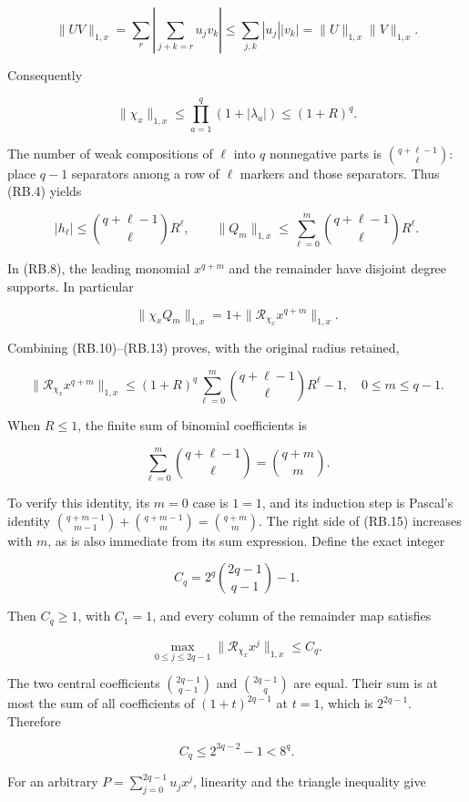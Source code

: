 \[
\|UV\|_{1,x}
=\sum_r\left|\sum_{j+k=r}u_jv_k\right|
\leq\sum_{j,k}|u_j||v_k|
=\|U\|_{1,x}\|V\|_{1,x}.
\tag{RB.10}
\]

Consequently

\[
\|\chi_x\|_{1,x}\leq\prod_{a=1}^{q}(1+|\lambda_a|)\leq(1+R)^q.
\tag{RB.11}
\]

The number of weak compositions of \(\ell\) into \(q\) nonnegative parts is \(\binom{q+\ell-1}{\ell}\): place \(q-1\) separators among a row of \(\ell\) markers and those separators. Thus (RB.4) yields

\[
|h_\ell|\leq\binom{q+\ell-1}{\ell}R^\ell,
\qquad
\|Q_m\|_{1,x}\leq
\sum_{\ell=0}^{m}\binom{q+\ell-1}{\ell}R^\ell.
\tag{RB.12}
\]

In (RB.8), the leading monomial \(x^{q+m}\) and the remainder have disjoint degree supports. In particular

\[
\|\chi_xQ_m\|_{1,x}=1+\|\mathcal R_{\chi_x}x^{q+m}\|_{1,x}.
\tag{RB.13}
\]

Combining (RB.10)--(RB.13) proves, with the original radius retained,

\[
\boxed{
\|\mathcal R_{\chi_x}x^{q+m}\|_{1,x}
\leq (1+R)^q
\sum_{\ell=0}^{m}\binom{q+\ell-1}{\ell}R^\ell-1,
\quad 0\leq m\leq q-1.}
\tag{RB.14}
\]

When \(R\leq1\), the finite sum of binomial coefficients is

\[
\sum_{\ell=0}^{m}\binom{q+\ell-1}{\ell}=\binom{q+m}{m}.
\tag{RB.15}
\]

To verify this identity, its \(m=0\) case is \(1=1\), and its induction step is Pascal's identity \(\binom{q+m-1}{m-1}+\binom{q+m-1}{m}=\binom{q+m}{m}\). The right side of (RB.15) increases with \(m\), as is also immediate from its sum expression. Define the exact integer

\[
C_q=2^q\binom{2q-1}{q-1}-1.
\tag{RB.16}
\]

Then \(C_q\geq1\), with \(C_1=1\), and every column of the remainder map satisfies

\[
\max_{0\leq j\leq2q-1}\|\mathcal R_{\chi_x}x^j\|_{1,x}\leq C_q.
\tag{RB.17}
\]

The two central coefficients \(\binom{2q-1}{q-1}\) and \(\binom{2q-1}{q}\) are equal. Their sum is at most the sum of all coefficients of \((1+t)^{2q-1}\) at \(t=1\), which is \(2^{2q-1}\). Therefore

\[
\boxed{C_q\leq2^{3q-2}-1<8^q.}
\tag{RB.18}
\]

For an arbitrary \(P=\sum_{j=0}^{2q-1}u_jx^j\), linearity and the triangle inequality give

